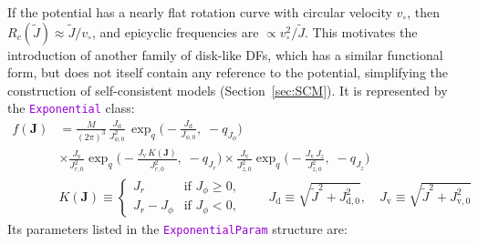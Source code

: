 \documentclass[12pt]{article}
\newcommand{\ttt}[1]{\textcolor{darkviolet}{\texttt{#1}}}
\newcommand{\bJ}{\boldsymbol{J}}
\begin{document}
If the potential has a nearly flat rotation curve with circular velocity $v_\circ$, then $R_c(\tilde J) \approx \tilde J/v_\circ$, and epicyclic frequencies are $\propto v_\circ^2 / \tilde J$. This motivates the introduction of another family of disk-like DFs, which has a similar functional form, but does not itself contain any reference to the potential, simplifying the construction of self-consistent models (Section~\ref{sec:SCM}). It is represented by the \ttt{Exponential} class:
\begin{align*}
f(\bJ) &= \frac{M}{(2\pi)^3}\, \frac{J_\mathrm{d}}{J_{\phi,0}^2}\,
\exp_q\bigg(-\frac{J_\mathrm{d}}{J_{\phi,0}},\; -q_{J_\phi}\bigg) \\ &\times
\frac{J_\mathrm{v}}{J_{r,0}^2} \exp_q\bigg(-\frac{J_\mathrm{v}\,K(\bJ)}{J_{r,0}^2},\; -q_{J_r}\bigg) \times
\frac{J_\mathrm{v}}{J_{z,0}^2} \exp_q\bigg(-\frac{J_\mathrm{v}\,J_z   }{J_{z,0}^2},\; -q_{J_z}\bigg) \\
&K(\bJ) \equiv \left\{ \begin{array}{ll}  J_r & \mbox{if }J_\phi\ge 0, \\
J_r-J_\phi & \mbox{if }J_\phi<0, \end{array} \right. \qquad
J_\mathrm{d} \equiv \sqrt{\tilde J^2 + J_\mathrm{d,0}^2}, \quad
J_\mathrm{v} \equiv \sqrt{\tilde J^2 + J_\mathrm{v,0}^2}
\end{align*}
Its parameters listed in the \ttt{ExponentialParam} structure are:
\end{document}

